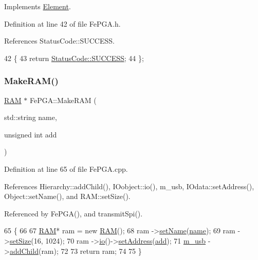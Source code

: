 Implements \hyperlink{classElement_af42754b5cabc198869222725218d695c}{Element}.



Definition at line 42 of file Fe\+P\+G\+A.\+h.



References Status\+Code\+::\+S\+U\+C\+C\+E\+SS.


\begin{DoxyCode}
42                     \{
43     \textcolor{keywordflow}{return} \hyperlink{classStatusCode_a6f565cbeadc76d14c72f047e5e85eb4badd0da38d3ba0d922efd1f4619bc37ad8}{StatusCode::SUCCESS};
44   \};
\end{DoxyCode}
\mbox{\label{classFePGA_a77a1e1c120fca21125b5e43f3679d522}} 
\subsubsection{\texorpdfstring{Make\+R\+A\+M()}{MakeRAM()}}
{\footnotesize\ttfamily \hyperlink{classRAM}{R\+AM} $\ast$ Fe\+P\+G\+A\+::\+Make\+R\+AM (\begin{DoxyParamCaption}\item[{std\+::string}]{name,  }\item[{unsigned int}]{add }\end{DoxyParamCaption})\hspace{0.3cm}{\ttfamily [private]}}



Definition at line 65 of file Fe\+P\+G\+A.\+cpp.



References Hierarchy\+::add\+Child(), I\+Oobject\+::io(), m\+\_\+usb, I\+Odata\+::set\+Address(), Object\+::set\+Name(), and R\+A\+M\+::set\+Size().



Referenced by Fe\+P\+G\+A(), and transmit\+Spi().


\begin{DoxyCode}
65                                                    \{
66 
67   \hyperlink{classRAM}{RAM}* ram = \textcolor{keyword}{new} \hyperlink{classRAM}{RAM}();
68   ram   ->\hyperlink{classObject_ae30fea75683c2d149b6b6d17c09ecd0c}{setName}(\hyperlink{classObject_a300f4c05dd468c7bb8b3c968868443c1}{name});
69   ram   ->\hyperlink{classRAM_adcf2ebb12f1a3e833ce7d5a33670c29d}{setSize}(16, 1024);        
70   ram   ->\hyperlink{classIOobject_af04fb94137c3d86849f478ac5afab5d1}{io}()->\hyperlink{classIOdata_af98cbfbc28346ebb9b64ca0203af1463}{setAddress}(\hyperlink{classAttrib_a235f773af19c900264a190b00a3b4ad7}{add});
71   \hyperlink{classFePGA_afb7947e600a66d914ee524acec3d8b1f}{m\_usb} ->\hyperlink{classHierarchy_ad677774ff38fcb257c04a3a10d471fac}{addChild}(ram);
72 
73   \textcolor{keywordflow}{return} ram;
74 
75 \}
\end{DoxyCode}
\mbox{\label{classFePGA_a83286ca5b6d8dbab0e95903d8f424783}} 
